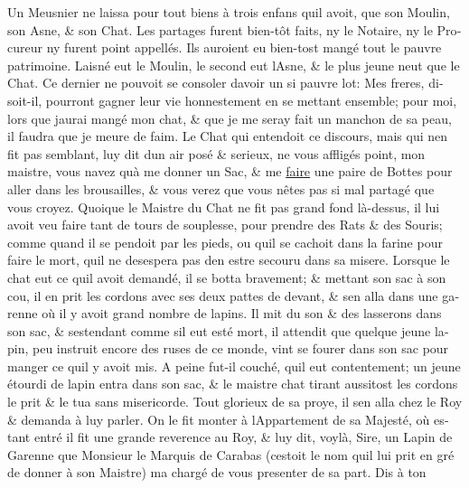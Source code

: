 \documentclass[14pt,a4paper]{memoir}
\newcommand{\ul}[1]{\uline{#1}}
\begin{document}
\begin{otherlanguage}{french}
Un Meusnier ne laissa pour tout biens à trois enfans
qu\textquotesingle il avoit, que son Moulin, son Asne, \& son Chat. Les
partages furent bien-tôt faits, ny le Notaire, ny le Procureur
n\textquotesingle y furent point appellés. Ils auroient eu bien-tost
mangé tout le pauvre patrimoine. L\textquotesingle aisné eut le Moulin,
le second eut l\textquotesingle Asne, \& le plus jeune
n\textquotesingle eut que le Chat. Ce dernier ne pouvoit se consoler
d\textquotesingle avoir un si pauvre lot: Mes freres, disoit-il,
pourront gagner leur vie honnestement en se mettant ensemble; pour moi,
lors que j\textquotesingle aurai mangé mon chat, \& que je me seray fait
un manchon de sa peau, il faudra que je meure de faim. Le Chat qui
entendoit ce discours, mais qui n\textquotesingle en fit pas semblant,
luy dit dun air posé \& serieux, ne vous affligés point, mon maistre,
vous n\textquotesingle avez qu\textquotesingle à me donner un Sac, \& me
\ul{faire} une paire de Bottes pour aller dans les brousailles, \& vous
verez que vous n\textquotesingle êtes pas si mal partagé que vous
croyez. Quoique le Maistre du Chat ne fit pas grand fond là-dessus, il
lui avoit veu faire tant de tours de souplesse, pour prendre des Rats \&
des Souris; comme quand il se pendoit par les pieds, ou
qu\textquotesingle il se cachoit dans la farine pour faire le mort,
qu\textquotesingle il ne desespera pas d\textquotesingle en estre
secouru dans sa misere. Lorsque le chat eut ce qu\textquotesingle il
avoit demandé, il se botta bravement; \& mettant son sac à son cou, il
en prit les cordons avec ses deux pattes de devant, \&
s\textquotesingle en alla dans une garenne où il y avoit grand nombre de
lapins. Il mit du son \& des lasserons dans son sac, \&
s\textquotesingle estendant comme s\textquotesingle il eut esté mort, il
attendit que quelque jeune lapin, peu instruit encore des ruses de ce
monde, vint se fourer dans son sac pour manger ce qu\textquotesingle il
y avoit mis. A peine fut-il couché, qu\textquotesingle il eut
contentement; un jeune étourdi de lapin entra dans son sac, \& le
maistre chat tirant aussitost les cordons le prit \& le tua sans
misericorde. Tout glorieux de sa proye, il s\textquotesingle en alla
chez le Roy \& demanda à luy parler. On le fit monter à
l\textquotesingle Appartement de sa Majesté, où estant entré il fit une
grande reverence au Roy, \& luy dit, voylà, Sire, un Lapin de Garenne
que Monsieur le Marquis de Carabas (c\textquotesingle estoit le nom
qu\textquotesingle il lui prit en gré de donner à son Maistre)
m\textquotesingle a chargé de vous presenter de sa part. Dis à ton

\end{otherlanguage}
\end{document}
